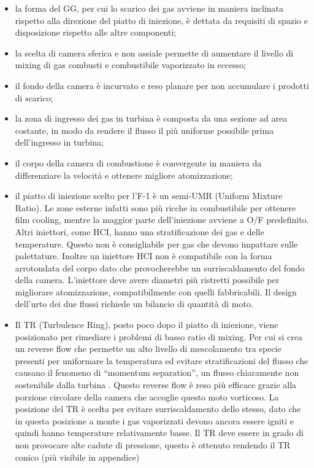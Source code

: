 \begin{itemize}[wide,itemsep=3pt,topsep=3pt]

\item
la forma del GG, per cui lo scarico dei gas avviene in maniera inclinata rispetto alla direzione del piatto di iniezione, è dettata da requisiti di spazio e disposizione rispetto alle altre componenti;

\item
la scelta di camera sferica e non assiale permette di aumentare il livello di mixing di gas combusti e combustibile vaporizzato in eccesso;

\item
il fondo della camera è incurvato e reso planare per non accumulare i prodotti di scarico;

\item
la zona di ingresso dei gas in turbina è composta da una sezione ad area costante, in modo da rendere il flusso il più uniforme possibile prima dell'ingresso in turbina;

\item
il corpo della camera di combustione è convergente in maniera da differenziare la velocità e ottenere migliore atomizzazione;

\item
il piatto di iniezione scelto per l’F-1 è un semi-UMR (Uniform Mixture Ratio). Le zone esterne infatti sono più ricche in combustibile per ottenere film cooling, mentre la maggior parte dell’iniezione avviene a O/F predefinito. Altri iniettori, come HCI, hanno una stratificazione dei gas e delle temperature. Questo non è consigliabile per gas che devono impattare sulle palettature. Inoltre un iniettore HCI non è compatibile con la forma arrotondata del corpo dato che provocherebbe un surriscaldamento del fondo della camera. L’iniettore deve avere diametri più ristretti possibile per migliorare atomizzazione, compatibilmente con quelli fabbricabili. Il design dell’urto dei due flussi richiede un bilancio di quantità di moto.

\item
Il TR (Turbulence Ring), posto poco dopo il piatto di iniezione, viene posizionato per rimediare i problemi di basso ratio di mixing. Per cui si crea un reverse flow che permette un alto livello di mescolamento tra specie presenti per uniformare la temperatura ed evitare stratificazioni del flusso che causano il fenomeno di “momentum separation”, un flusso chiaramente non sostenibile dalla turbina . Questo reverse flow è reso più efficace grazie alla porzione circolare della camera che accoglie questo moto vorticoso. La posizione del TR è scelta per evitare surriscaldamento dello stesso, dato che in questa posizione a monte i gas vaporizzati devono ancora essere igniti e quindi hanno temperature relativamente basse. Il TR deve essere in grado di non provocare alte cadute di pressione, questo è ottenuto rendendo il TR conico (più visibile in appendice)


\end{itemize}
